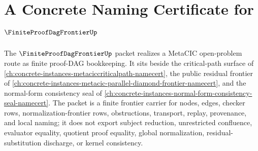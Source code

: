 \chapter{A Concrete Naming Certificate for $\FiniteProofDagFrontierUp$}
\label{ch:concrete-instances-finite-proof-dag-frontier-namecert}

The $\FiniteProofDagFrontierUp$ packet realizes a MetaCIC open-problem route as finite proof-DAG bookkeeping. It sits beside the critical-path surface of \autoref{ch:concrete-instances-metaciccriticalpath-namecert}, the public residual frontier of \autoref{ch:concrete-instances-metacic-parallel-diamond-frontier-namecert}, and the normal-form consistency seal of \autoref{ch:concrete-instances-normal-form-consistency-seal-namecert}. The packet is a finite frontier carrier for nodes, edges, checker rows, normalization-frontier rows, obstructions, transport, replay, provenance, and local naming; it does not export subject reduction, unrestricted confluence, evaluator equality, quotient proof equality, global normalization, residual-substitution discharge, or kernel consistency.


